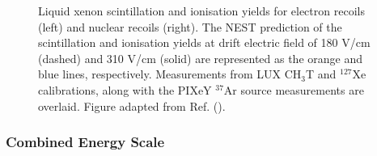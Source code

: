 \begin{figure}[hbt!]
\begin{subfigure}
    \end{subfigure}
    \vspace*{-5mm}
    \caption[Liquid xenon scintillation and ionisation yields for electron recoils and nuclear recoils.]%
    {Liquid xenon scintillation and ionisation yields for electron recoils (left) and nuclear recoils (right). The NEST prediction of the scintillation and ionisation yields at drift electric field of 180 V/cm (dashed) and 310 V/cm (solid) are represented as the orange and blue lines, respectively. Measurements from LUX CH$_{3}$T \cite{lux_tritium} and $^{127}$Xe \cite{lux_low_energy_cal} calibrations, along with the PIXeY $^{37}$Ar source measurements \cite{PIXeY} are overlaid. Figure adapted from Ref. (\cite{ibles}).}
    \label{fig:light_charge_yields}
\end{figure}
%

\subsubsection{Combined Energy Scale}
\label{subsubsec:combined_energy}

